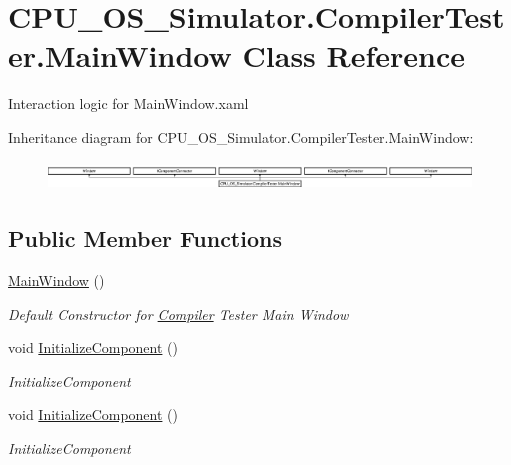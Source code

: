 \hypertarget{class_c_p_u___o_s___simulator_1_1_compiler_tester_1_1_main_window}{}\section{C\+P\+U\+\_\+\+O\+S\+\_\+\+Simulator.\+Compiler\+Tester.\+Main\+Window Class Reference}
\label{class_c_p_u___o_s___simulator_1_1_compiler_tester_1_1_main_window}


Interaction logic for Main\+Window.\+xaml  


Inheritance diagram for C\+P\+U\+\_\+\+O\+S\+\_\+\+Simulator.\+Compiler\+Tester.\+Main\+Window\+:\begin{figure}[H]
\begin{center}
\leavevmode
\includegraphics[height=0.761905cm]{class_c_p_u___o_s___simulator_1_1_compiler_tester_1_1_main_window}
\end{center}
\end{figure}
\subsection*{Public Member Functions}
\begin{DoxyCompactItemize}
\item 
\hyperlink{class_c_p_u___o_s___simulator_1_1_compiler_tester_1_1_main_window_a067de72c2192f57acab21aec73dd8074}{Main\+Window} ()
\begin{DoxyCompactList}\small\item\em Default Constructor for \hyperlink{namespace_c_p_u___o_s___simulator_1_1_compiler}{Compiler} Tester Main Window \end{DoxyCompactList}\item 
void \hyperlink{class_c_p_u___o_s___simulator_1_1_compiler_tester_1_1_main_window_a660feb0d1d06a39586989a4a9e5352ce}{Initialize\+Component} ()
\begin{DoxyCompactList}\small\item\em Initialize\+Component \end{DoxyCompactList}\item 
void \hyperlink{class_c_p_u___o_s___simulator_1_1_compiler_tester_1_1_main_window_a660feb0d1d06a39586989a4a9e5352ce}{Initialize\+Component} ()
\begin{DoxyCompactList}\small\item\em Initialize\+Component \end{DoxyCompactList}\end{DoxyCompactItemize}
